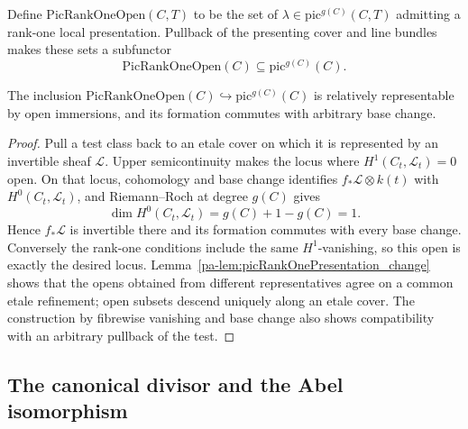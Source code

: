 \begin{definition}
  \label{pa-def:picRankOneOpen}
  \notready
  Define \(\mathrm{PicRankOneOpen}(C,T)\) to be the set of
  \(\lambda\in\mathrm{pic}^{g(C)}(C,T)\) admitting a rank-one local presentation.
  Pullback of the presenting cover and line bundles makes these sets a subfunctor
  \[
    \mathrm{PicRankOneOpen}(C)\subseteq\mathrm{pic}^{g(C)}(C).
  \]
\end{definition}

\begin{theorem}
  \label{pa-thm:picRankOneOpen_isOpen}
  \notready
  The inclusion
  \(\mathrm{PicRankOneOpen}(C)\hookrightarrow\mathrm{pic}^{g(C)}(C)\) is relatively
  representable by open immersions, and its formation commutes with arbitrary base change.
\end{theorem}
\begin{proof}
  Pull a test class back to an etale cover on which it is represented by an invertible sheaf
  \(\mathcal L\).  Upper semicontinuity makes the locus where
  \(H^1(C_t,\mathcal L_t)=0\) open.  On that locus, cohomology and base change identifies
  \(f_*\mathcal L\otimes k(t)\) with \(H^0(C_t,\mathcal L_t)\), and Riemann--Roch at degree
  \(g(C)\) gives
  \[
    \dim H^0(C_t,\mathcal L_t)=g(C)+1-g(C)=1.
  \]
  Hence \(f_*\mathcal L\) is invertible there and its formation commutes with every base
  change.  Conversely the rank-one conditions include the same \(H^1\)-vanishing, so this
  open is exactly the desired locus.  Lemma~\ref{pa-lem:picRankOnePresentation_change} shows
  that the opens obtained from different representatives agree on a common etale refinement;
  open subsets descend uniquely along an etale cover.  The construction by fibrewise
  vanishing and base change also shows compatibility with an arbitrary pullback of the test.
\end{proof}

\subsection{The canonical divisor and the Abel isomorphism}

